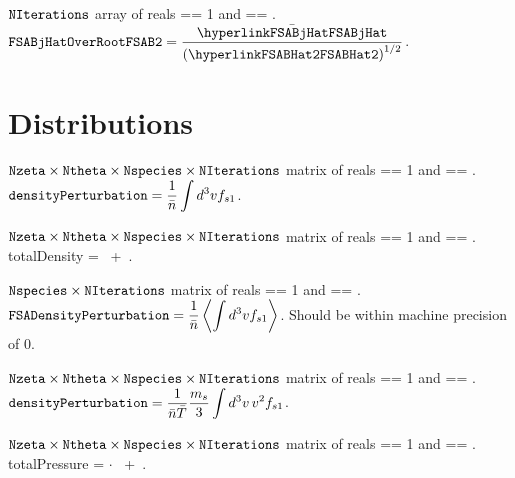 \myhrule

{$\text{\ttfamily NIterations}$ array of reals}
{ == 1 and  == \true.}
{$\displaystyle \text{\ttfamily FSABjHatOverRootFSAB2} =  \frac{\bar{\text{\parlink{FSABjHat}}}}{\left(\text{\parlink{FSABHat2}}\right)^{1/2}}$.}

\myhrule

\section{Distributions}

\myhrule

{$\text{\ttfamily Nzeta} \times \text{\ttfamily Ntheta} \times \text{\ttfamily Nspecies} \times \text{\ttfamily NIterations}$ matrix of reals}
{ == 1 and  == \true.}
{$\displaystyle \text{\ttfamily densityPerturbation} =  \frac{1}{\bar{n}} \int d^3v f_{s1}$.}

\myhrule

{$\text{\ttfamily Nzeta} \times \text{\ttfamily Ntheta} \times \text{\ttfamily Nspecies} \times \text{\ttfamily NIterations}$ matrix of reals}
{ == 1 and  == \true.}
{{\ttfamily totalDensity} = ~+~.}

\myhrule

{$\text{\ttfamily Nspecies} \times \text{\ttfamily NIterations}$ matrix of reals}
{ == 1 and  == \true.}
{$\displaystyle \text{\ttfamily FSADensityPerturbation} =  \frac{1}{\bar{n}} \left\langle \int d^3v f_{s1} \right\rangle$. 
Should be within machine precision of 0.}

\myhrule

{$\text{\ttfamily Nzeta} \times \text{\ttfamily Ntheta} \times \text{\ttfamily Nspecies} \times \text{\ttfamily NIterations}$ matrix of reals}
{ == 1 and  == \true.}
{$\displaystyle \text{\ttfamily densityPerturbation} =  \frac{1}{\bar{n} \bar{T}} \frac{m_s}{3} \int d^3v \, v^2 f_{s1}$.}

\myhrule

{$\text{\ttfamily Nzeta} \times \text{\ttfamily Ntheta} \times \text{\ttfamily Nspecies} \times \text{\ttfamily NIterations}$ matrix of reals}
{ == 1 and  == \true.}
{{\ttfamily totalPressure} =  $\cdot$ ~+~.}

